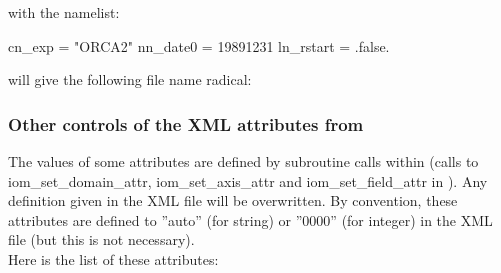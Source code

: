 \documentclass[../main/NEMO_manual]{subfiles}
\begin{document}
\noindent with the namelist:
\begin{forlines}
cn_exp    = "ORCA2"
nn_date0  = 19891231
ln_rstart = .false.
\end{forlines}

\noindent will give the following file name radical: 

\subsubsection{Other controls of the XML attributes from \NEMO}

The values of some attributes are defined by subroutine calls within \NEMO
(calls to iom\_set\_domain\_attr, iom\_set\_axis\_attr and iom\_set\_field\_attr in ).
Any definition given in the XML file will be overwritten.
By convention, these attributes are defined to ''auto'' (for string) or ''0000'' (for integer) in the XML file
(but this is not necessary).
\\

Here is the list of these attributes:
\\
\end{document}
